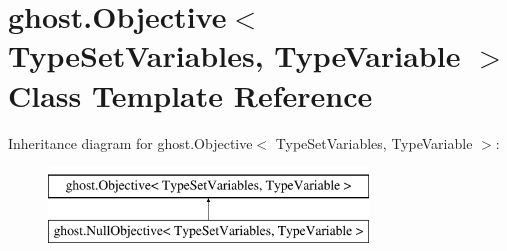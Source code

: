 \hypertarget{classghost_1_1Objective_3_01TypeSetVariables_00_01TypeVariable_01_4}{\section{ghost.\-Objective$<$ Type\-Set\-Variables, Type\-Variable $>$ Class Template Reference}
\label{classghost_1_1Objective_3_01TypeSetVariables_00_01TypeVariable_01_4}
}
Inheritance diagram for ghost.\-Objective$<$ Type\-Set\-Variables, Type\-Variable $>$\-:\begin{figure}[H]
\begin{center}
\leavevmode
\includegraphics[height=2.000000cm]{classghost_1_1Objective_3_01TypeSetVariables_00_01TypeVariable_01_4}
\end{center}
\end{figure}
